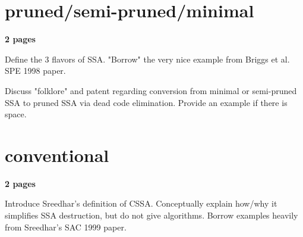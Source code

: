 \section{pruned/semi-pruned/minimal}

\textbf{2 pages}

Define the 3 flavors of SSA. "Borrow" the very nice
example from Briggs et al. SPE 1998 paper. 

Discuss "folklore" and patent regarding conversion
from minimal or semi-pruned SSA to pruned SSA via
dead code elimination. Provide an example if there
is space. 

\section{conventional}

\textbf{2 pages}

Introduce Sreedhar's definition of CSSA. Conceptually
explain how/why it simplifies SSA destruction, but do
not give algorithms. Borrow examples heavily from
Sreedhar's SAC 1999 paper.